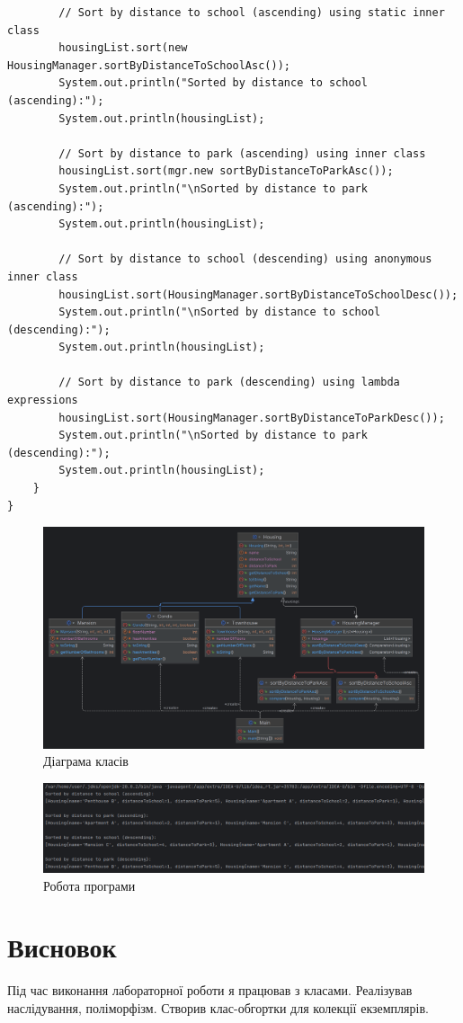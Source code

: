 \documentclass[14pt]{extreport}
\begin{document}
\begin{normalsize}
\begin{lstlisting}
		// Sort by distance to school (ascending) using static inner class
		housingList.sort(new HousingManager.sortByDistanceToSchoolAsc());
		System.out.println("Sorted by distance to school (ascending):");
		System.out.println(housingList);
		
		// Sort by distance to park (ascending) using inner class
		housingList.sort(mgr.new sortByDistanceToParkAsc());
		System.out.println("\nSorted by distance to park (ascending):");
		System.out.println(housingList);
		
		// Sort by distance to school (descending) using anonymous inner class
		housingList.sort(HousingManager.sortByDistanceToSchoolDesc());
		System.out.println("\nSorted by distance to school (descending):");
		System.out.println(housingList);
		
		// Sort by distance to park (descending) using lambda expressions
		housingList.sort(HousingManager.sortByDistanceToParkDesc());
		System.out.println("\nSorted by distance to park (descending):");
		System.out.println(housingList);
	}
}

	\end{lstlisting}	
	
	
	\begin{figure}[H]
		\centering
		\includegraphics[scale=0.18]{2}
		\caption{Діаграма класів}
	\end{figure}
	
	\begin{figure}[H]
		\centering
		\includegraphics[scale=0.4]{1}
		\caption{Робота програми}
	\end{figure}

	\section*{Висновок}
	Під час виконання лабораторної роботи я працював з класами. Реалізував наслідування, поліморфізм. Створив клас-обгортки для
	колекції екземплярів.
	 
\end{normalsize}
\end{document}
